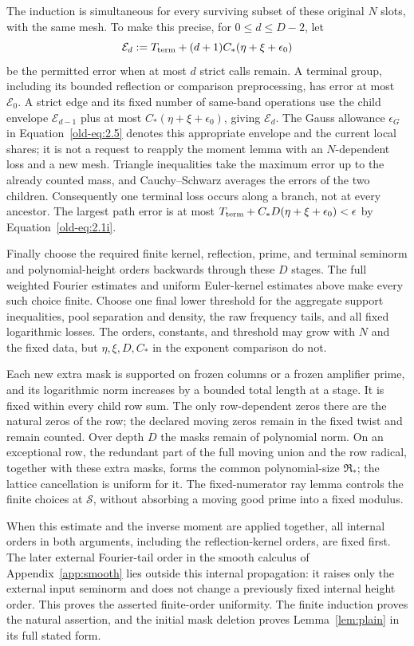 \documentclass[12pt]{article}
\begin{document}
The induction is simultaneous for every surviving subset of these
original \(N\) slots, with the same mesh.  To make this precise, for
\(0\le d\le D-2\), let
\[
 \mathcal E_d
 :=T_{\rm term}+(d+1)C_*(\eta+\xi+\epsilon_0)
\]
be the permitted error when at most \(d\) strict calls remain.
A terminal group, including its bounded reflection or comparison
preprocessing, has error at most \(\mathcal E_0\).  A strict edge
and its fixed number of same-band operations use the child envelope
\(\mathcal E_{d-1}\) plus at most
\(C_*(\eta+\xi+\epsilon_0)\), giving \(\mathcal E_d\).
The Gauss allowance \(\epsilon_G\) in
Equation~\eqref{old-eq:2.5} denotes this appropriate envelope and
the current local shares; it is not a request to reapply the moment
lemma with an \(N\)-dependent loss and a new mesh.  Triangle
inequalities take the maximum error up to the already counted mass,
and Cauchy--Schwarz averages the errors of the two children.
Consequently one terminal loss occurs along a branch, not at every
ancestor.  The largest path error is at most
\(T_{\rm term}+C_*D(\eta+\xi+\epsilon_0)<\epsilon\) by
Equation~\eqref{old-eq:2.1i}.

Finally choose the required finite kernel, reflection, prime, and
terminal seminorm and polynomial-height orders backwards through
these \(D\) stages.  The full weighted Fourier estimates and uniform
Euler-kernel estimates above make every such choice finite.  Choose
one final lower threshold for the aggregate support inequalities,
pool separation and density, the raw frequency tails, and all fixed
logarithmic losses.  The orders, constants, and threshold may grow
with \(N\) and the fixed data, but \(\eta,\xi,D,C_*\) in the
exponent comparison do not.

Each new extra mask is supported on frozen columns or a frozen
amplifier prime, and its logarithmic norm increases by a bounded
total length at a stage.  It is fixed within every child row sum.
The only row-dependent zeros there are the natural zeros of the row;
the declared moving zeros remain in the fixed twist and remain counted.
Over depth \(D\) the masks remain of polynomial norm.
On an exceptional row, the redundant part of the full moving union
and the row radical, together with these extra masks, forms the
common polynomial-size \(\mathfrak R_*\); the lattice cancellation
is uniform for it.  The fixed-numerator ray lemma controls the
finite choices at \(\mathcal S\), without absorbing a moving good
prime into a fixed modulus.

When this estimate and the inverse moment are applied together, all internal
orders in both arguments, including the reflection-kernel orders,
are fixed first.  The later external Fourier-tail order in
the smooth calculus of Appendix~\ref{app:smooth} lies outside this internal
propagation: it raises only the external input seminorm and does
not change a previously fixed internal height order.  This proves
the asserted finite-order uniformity.  The finite induction proves
the natural assertion, and the initial mask deletion proves
Lemma~\ref{lem:plain} in its full stated form.
\end{document}
